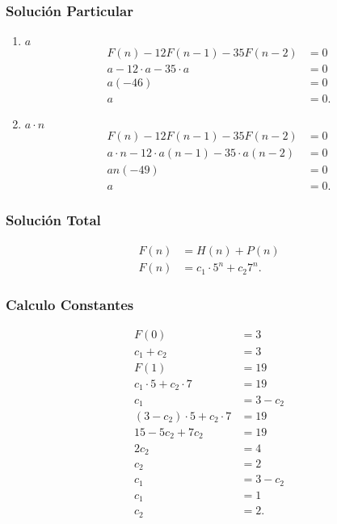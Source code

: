     \subsubsection*{Solución Particular}
    \begin{enumerate}
      \item $a$
	\begin{align*}
	  F\left( n \right) - 12F\left( n -1 \right) - 35F\left( n - 2 \right) &= 0 \\
	  a - 12\cdot a - 35\cdot a &= 0 \\
	  a\left( -46 \right) &= 0 \\
	  a &= 0
	.\end{align*}
      \item $a \cdot n$ 
	\begin{align*}
	  F\left( n \right) - 12F\left( n -1 \right) - 35F\left( n - 2 \right) &= 0 \\
	  a\cdot n - 12\cdot a \left( n - 1 \right) - 35 \cdot a \left( n - 2 \right) &= 0 \\
	  an\left( -49 \right) &= 0 \\
	  a &= 0
	.\end{align*}
    \end{enumerate}
    \subsubsection*{Solución Total}
    \begin{align*}
      F\left( n \right) &= H\left( n \right) + P\left( n \right)  \\
      F\left( n \right) &= c_1\cdot 5^{n} + c_2 7^{n}
    .\end{align*}

    \subsubsection*{Calculo Constantes}
    \begin{align*}
      F\left( 0 \right) &= 3 \\
      c_1 + c_2 &= 3 \\
      F\left( 1 \right) &= 19 \\
      c_1\cdot 5 + c_2 \cdot 7 &= 19 \\
      c_1 &= 3 - c_2 \\
      \left( 3 - c_2 \right)\cdot 5 + c_2 \cdot 7 &= 19 \\
      15 - 5c_2 + 7c_2 &= 19 \\
      2c_2 &= 4 \\
      c_2 &= 2 \\
      c_1 &= 3 - c_2 \\
      c_1 &= 1 \\
      c_2 &= 2
    .\end{align*}
